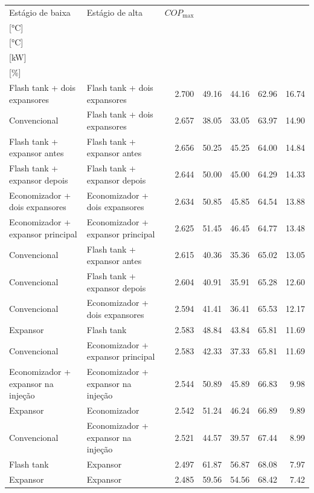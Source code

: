 {\small\setlength{\tabcolsep}{4pt}\renewcommand{\arraystretch}{1.12}
\begin{tabular}{llrrrrr}
\toprule
Estágio de baixa & Estágio de alta & $COP_{\max}$ & \shortstack{$T_{\mathrm{cond,l}}^*$\\{[°C]}} & \shortstack{$T_{\mathrm{evap,h}}^*$\\{[°C]}} & \shortstack{$\dot W_{\mathrm{liq}}$\\{[kW]}} & \shortstack{$\Delta COP_{\mathrm{opt}}$\\{[\%]}} \\
\midrule
Flash tank + dois expansores & Flash tank + dois expansores & 2.700 & 49.16 & 44.16 & 62.96 & 16.74 \\
Convencional & Flash tank + dois expansores & 2.657 & 38.05 & 33.05 & 63.97 & 14.90 \\
Flash tank + expansor antes & Flash tank + expansor antes & 2.656 & 50.25 & 45.25 & 64.00 & 14.84 \\
Flash tank + expansor depois & Flash tank + expansor depois & 2.644 & 50.00 & 45.00 & 64.29 & 14.33 \\
Economizador + dois expansores & Economizador + dois expansores & 2.634 & 50.85 & 45.85 & 64.54 & 13.88 \\
Economizador + expansor principal & Economizador + expansor principal & 2.625 & 51.45 & 46.45 & 64.77 & 13.48 \\
Convencional & Flash tank + expansor antes & 2.615 & 40.36 & 35.36 & 65.02 & 13.05 \\
Convencional & Flash tank + expansor depois & 2.604 & 40.91 & 35.91 & 65.28 & 12.60 \\
Convencional & Economizador + dois expansores & 2.594 & 41.41 & 36.41 & 65.53 & 12.17 \\
Expansor & Flash tank & 2.583 & 48.84 & 43.84 & 65.81 & 11.69 \\
Convencional & Economizador + expansor principal & 2.583 & 42.33 & 37.33 & 65.81 & 11.69 \\
Economizador + expansor na injeção & Economizador + expansor na injeção & 2.544 & 50.89 & 45.89 & 66.83 & 9.98 \\
Expansor & Economizador & 2.542 & 51.24 & 46.24 & 66.89 & 9.89 \\
Convencional & Economizador + expansor na injeção & 2.521 & 44.57 & 39.57 & 67.44 & 8.99 \\
Flash tank & Expansor & 2.497 & 61.87 & 56.87 & 68.08 & 7.97 \\
Expansor & Expansor & 2.485 & 59.56 & 54.56 & 68.42 & 7.42 \\

\end{tabular}}
